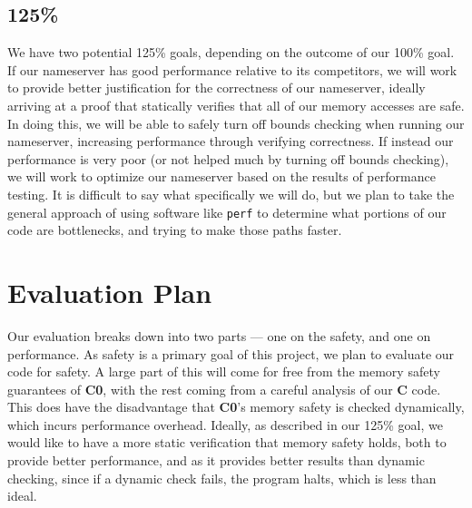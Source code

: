 \documentclass{article}
\newcommand\Kwd[1]{{\sffamily\bfseries{#1}}}
\begin{document}
\subsection{125\%}

We have two potential 125\% goals, depending on the outcome of our 100\% goal. If our nameserver has good performance relative to its competitors, we will work to provide better justification for the correctness of our nameserver, ideally arriving at a proof that statically verifies that all of our memory accesses are safe. In doing this, we will be able to safely turn off bounds checking when running our nameserver, increasing performance through verifying correctness. If instead our performance is very poor (or not helped much by turning off bounds checking), we will work to optimize our nameserver based on the results of performance testing. It is difficult to say what specifically we will do, but we plan to take the general approach of using software like \texttt{perf} to determine what portions of our code are bottlenecks, and trying to make those paths faster.

\section{Evaluation Plan}

Our evaluation breaks down into two parts --- one on the safety, and one on performance. As safety is a primary goal of this project, we plan to evaluate our code for safety. A large part of this will come for free from the memory safety guarantees of \Kwd{C0}, with the rest coming from a careful analysis of our \Kwd{C} code. This does have the disadvantage that \Kwd{C0}'s memory safety is checked dynamically, which incurs performance overhead. Ideally, as described in our 125\% goal, we would like to have a more static verification that memory safety holds, both to provide better performance, and as it provides better results than dynamic checking, since if a dynamic check fails, the program halts, which is less than ideal.
\end{document}
